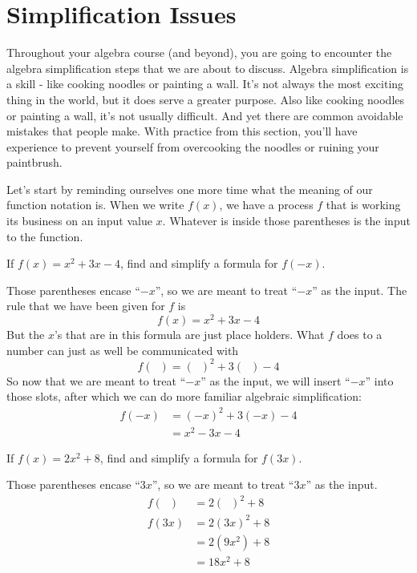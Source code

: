 \section{Simplification Issues}

Throughout your algebra course (and beyond), you are going to encounter the algebra simplification steps that we are about to discuss. Algebra simplification is a skill - like cooking noodles or painting a wall. It's not always the most exciting thing in the world, but it does serve a greater purpose. Also like cooking noodles or painting a wall, it's not usually difficult. And yet there are common avoidable mistakes that people make. With practice from this section, you'll have experience to prevent yourself from overcooking the noodles or ruining your paintbrush.

Let's start by reminding ourselves one more time what the meaning of our function notation is. When we write $f(x)$, we have a process $f$ that is working its business on an input value $x$. Whatever is inside those parentheses is the input to the function.

\begin{pccexample}\label{fun:ex:fminusx}
If $f(x)=x^2+3x-4$, find and simplify a formula for $f(-x)$.
\begin{pccsolution}
Those parentheses encase ``$-x$'', so we are meant to treat ``$-x$'' as the input. The rule that we have been given for $f$ is 
\[f(x)=x^2+3x-4\]
But the $x$'s that are in this formula are just place holders. What $f$ does to a number can just as well be communicated with
\[f(\phantom{x})=(\phantom{x})^2+3(\phantom{x})-4\]
So now that we are meant to treat ``$-x$'' as the input, we will insert ``$-x$'' into those slots, after which we can do more familiar algebraic simplification:
\begin{align*}
f(-x)&=(-x)^2+3(-x)-4\\
&=x^2-3x-4
\end{align*}
\end{pccsolution}
\end{pccexample}

\begin{pccexample}\label{fun:ex:fthreex}
If $f(x)=2x^2+8$, find and simplify a formula for $f(3x)$.
\begin{pccsolution}
Those parentheses encase ``$3x$'', so we are meant to treat ``$3x$'' as the input. 
\begin{align*}
f(\phantom{x})&=2(\phantom{x})^2+8\\
f(3x)&=2(3x)^2+8\\
&=2(9x^2)+8\\
&=18x^2+8
\end{align*}
\end{pccsolution}
\end{pccexample}

